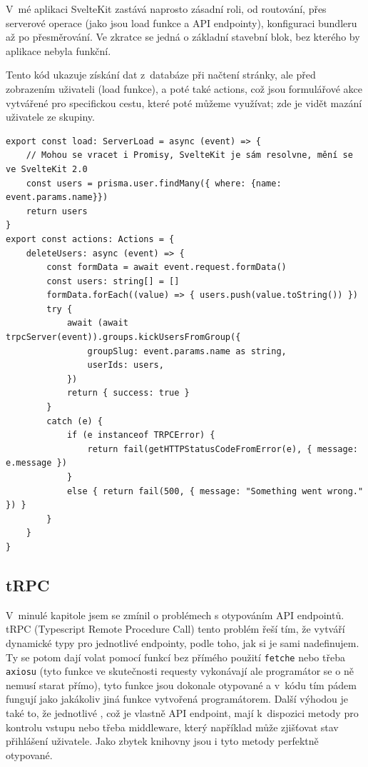\documentclass[12pt, a4paper,
openright
]{report}
\begin{document}
V~mé aplikaci SvelteKit zastává naprosto zásadní roli, od routování, přes serverové operace (jako jsou load funkce a API endpointy), konfiguraci bundleru až po přesměrování. Ve zkratce se jedná o základní stavební blok, bez kterého by aplikace nebyla funkční.

Tento kód ukazuje získání dat z~databáze při načtení stránky, ale před zobrazením uživateli (load funkce), a poté také actions, což jsou formulářové akce vytvářené pro specifickou cestu, které poté můžeme využívat; zde je vidět mazání uživatele ze skupiny.
\clearpage
\begin{lstlisting}[style=ES6, caption=Ukázka z +page.server.ts, label=sveltekit_code]
export const load: ServerLoad = async (event) => {
	// Mohou se vracet i Promisy, SvelteKit je sám resolvne, mění se ve SvelteKit 2.0
	const users = prisma.user.findMany({ where: {name: event.params.name}})
	return users
}
export const actions: Actions = {
	deleteUsers: async (event) => {
		const formData = await event.request.formData()
		const users: string[] = []
		formData.forEach((value) => { users.push(value.toString()) })
		try {
			await (await trpcServer(event)).groups.kickUsersFromGroup({
				groupSlug: event.params.name as string,
				userIds: users,
			})
			return { success: true }
		}
		catch (e) {
			if (e instanceof TRPCError) {
				return fail(getHTTPStatusCodeFromError(e), { message: e.message })
			}
			else { return fail(500, { message: "Something went wrong." }) }
		}
	}
}
\end{lstlisting}

\subsection{tRPC}
V~minulé kapitole jsem se zmínil o problémech s otypováním API endpointů. tRPC (Typescript Remote Procedure Call) tento problém řeší tím, že vytváří dynamické typy pro jednotlivé endpointy, podle toho, jak si je sami nadefinujem. Ty se potom dají volat pomocí funkcí bez přímého použití \texttt{fetche} nebo třeba \texttt{axiosu} (tyto funkce ve skutečnosti  requesty vykonávají ale programátor se o ně nemusí starat přímo), tyto funkce jsou dokonale otypované a v~kódu tím pádem fungují jako jakákoliv jiná funkce vytvořená programátorem. Další výhodou je také to, že jednotlivé , což je vlastně API endpoint, mají k~dispozici metody pro kontrolu vstupu nebo třeba middleware, který například může zjišťovat stav přihlášení uživatele. Jako zbytek knihovny jsou i tyto metody perfektně otypované.
\end{document}
